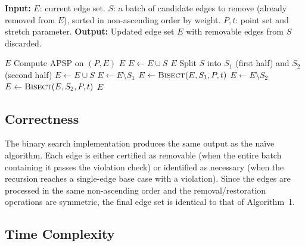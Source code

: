 \documentclass{article}
\begin{document}
\begin{algorithm}
\caption{\textsc{Bisect}$(E, S, P, t)$}
\begin{algorithmic}[1]
\Statex \textbf{Input:}
\Statex \hspace{1cm} $E$: current edge set.
\Statex \hspace{1cm} $S$: a batch of candidate edges to remove (already removed from $E$), sorted in non-ascending order by weight.
\Statex \hspace{1cm} $P, t$: point set and stretch parameter.
\Statex \textbf{Output:}
\Statex \hspace{1cm} Updated edge set $E$ with removable edges from $S$ discarded.

    \State \Return $E$
\EndIf
\State Compute APSP on $(P, E)$
    \State \Return $E$ 
\EndIf
{}
    \State $E \leftarrow E \cup S$ 
    \State \Return $E$
\EndIf
\State Split $S$ into $S_1$ (first half) and $S_2$ (second half)
\State $E \leftarrow E \cup S$ 
\State $E \leftarrow E \setminus S_1$
\State $E \leftarrow \textsc{Bisect}(E, S_1, P, t)$ 
\State $E \leftarrow E \setminus S_2$
\State $E \leftarrow \textsc{Bisect}(E, S_2, P, t)$ 
\State \Return $E$
\end{algorithmic}
\end{algorithm}

\subsection{Correctness}

The binary search implementation produces the same output as the na\"ive algorithm. Each edge is either certified as removable (when the entire batch containing it passes the violation check) or identified as necessary (when the recursion reaches a single-edge base case with a violation). Since the edges are processed in the same non-ascending order and the removal/restoration operations are symmetric, the final edge set is identical to that of Algorithm~1.

\subsection{Time Complexity}
\end{document}

